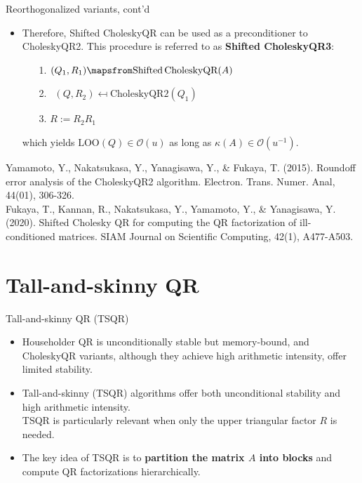 \documentclass[t,usepdftitle=false]{beamer}
\begin{document}
\begin{frame}{Reorthogonalized variants, cont'd}
\begin{itemize}
\item Therefore, Shifted CholeskyQR can be used as a preconditioner to CholeskyQR2. 
This procedure is referred to as \textbf{Shifted CholeskyQR3}:
\begin{itemize}
\item[1.]$(Q_1,R_1)\mapsfrom\text{Shifted\,CholeskyQR}(A)$\vspace{.1cm}
\item[2.]$\;\,(Q,R_2)\mapsfrom\text{CholeskyQR2}(Q_1)$\vspace{.1cm}
\item[3.]$R:=R_2R_1$
\end{itemize}
which yields $\text{LOO}(Q)\in\mathcal{O}(u)$ as long as $\kappa(A)\in\mathcal{O}(u^{-1})$.
\end{itemize}
\medskip
\tiny{Yamamoto, Y., Nakatsukasa, Y., Yanagisawa, Y., \& Fukaya, T. (2015). Roundoff error analysis of the CholeskyQR2 algorithm. Electron. Trans. Numer. Anal, 44(01), 306-326.}\smallskip\\
\tiny{Fukaya, T., Kannan, R., Nakatsukasa, Y., Yamamoto, Y., \& Yanagisawa, Y. (2020). Shifted Cholesky QR for computing the QR factorization of ill-conditioned matrices. SIAM Journal on Scientific Computing, 42(1), A477-A503.}
\end{frame}

\section{Tall-and-skinny QR}

\begin{frame}{Tall-and-skinny QR (TSQR)}
\begin{itemize}
\item Householder QR is unconditionally stable but memory-bound, and CholeskyQR variants, although they achieve high arithmetic intensity, offer limited stability.
\item Tall-and-skinny (TSQR) algorithms offer both unconditional stability and high arithmetic intensity.\vspace{.1cm}\\
TSQR is particularly relevant when only the upper triangular factor $R$ is needed.
\item The key idea of TSQR is to \textbf{partition the matrix $A$ into blocks} and compute QR factorizations hierarchically.
\end{itemize}
\end{frame}
\end{document}
